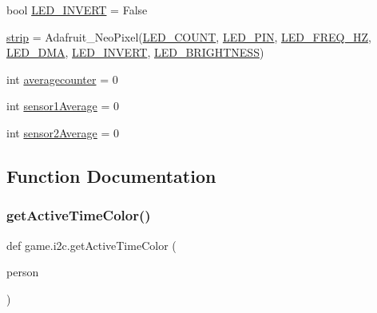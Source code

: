 \begin{DoxyCompactItemize}
\item 
bool \hyperlink{namespacegame_1_1i2c_a02f2f11be4e8df2102f522e3e8983d7b}{L\+E\+D\+\_\+\+I\+N\+V\+E\+RT} = False
\item 
\hyperlink{namespacegame_1_1i2c_a42641ead00dd4d143296d15b3987dea9}{strip} = Adafruit\+\_\+\+Neo\+Pixel(\hyperlink{namespacegame_1_1i2c_a0150eb7d9551697284fa8def1d6a5e78}{L\+E\+D\+\_\+\+C\+O\+U\+NT}, \hyperlink{namespacegame_1_1i2c_a7d6ed2029581b42043aa921270f03362}{L\+E\+D\+\_\+\+P\+IN}, \hyperlink{namespacegame_1_1i2c_a4985f02a4206248cfb12e46ac7e5fa1a}{L\+E\+D\+\_\+\+F\+R\+E\+Q\+\_\+\+HZ}, \hyperlink{namespacegame_1_1i2c_a3577c4e268c23fe92bb64fdb4c878027}{L\+E\+D\+\_\+\+D\+MA}, \hyperlink{namespacegame_1_1i2c_a02f2f11be4e8df2102f522e3e8983d7b}{L\+E\+D\+\_\+\+I\+N\+V\+E\+RT}, \hyperlink{namespacegame_1_1i2c_ac0bf31bc536242ae4682e1d4e782f671}{L\+E\+D\+\_\+\+B\+R\+I\+G\+H\+T\+N\+E\+SS})
\item 
int \hyperlink{namespacegame_1_1i2c_a8ae8dfaf0d98d3e56f9f87fa8d863668}{averagecounter} = 0
\item 
int \hyperlink{namespacegame_1_1i2c_a90ec455573b3639b7b0d7df1fc0d86db}{sensor1\+Average} = 0
\item 
int \hyperlink{namespacegame_1_1i2c_a7d4f6ad3f32515d2299fa2bccce619cf}{sensor2\+Average} = 0
\end{DoxyCompactItemize}


\subsection{Function Documentation}
\hypertarget{namespacegame_1_1i2c_a16a8d8b75765d12d7dfd792a454d7f18}{}\label{namespacegame_1_1i2c_a16a8d8b75765d12d7dfd792a454d7f18} 
\subsubsection{\texorpdfstring{get\+Active\+Time\+Color()}{getActiveTimeColor()}}
{\footnotesize\ttfamily def game.\+i2c.\+get\+Active\+Time\+Color (\begin{DoxyParamCaption}\item[{}]{person }\end{DoxyParamCaption})}

\hypertarget{namespacegame_1_1i2c_acd6c2462d1aa66a93f0c6a0082e5e905}{}\label{namespacegame_1_1i2c_acd6c2462d1aa66a93f0c6a0082e5e905} 
